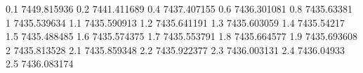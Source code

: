 0.1	7449.815936
0.2	7441.411689
0.4	7437.407155
0.6	7436.301081
0.8	7435.63381
1	7435.539634
1.1	7435.590913
1.2	7435.641191
1.3	7435.603059
1.4	7435.54217
1.5	7435.488485
1.6	7435.574375
1.7	7435.553791
1.8	7435.664577
1.9	7435.693608
2	7435.813528
2.1	7435.859348
2.2	7435.922377
2.3	7436.003131	
2.4	7436.04933
2.5	7436.083174

